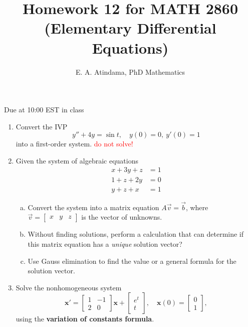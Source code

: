 \documentclass[a4paper,11pt,reqno]{amsart}
\title[MATH 2860 (Elementary Differential Equations)]{Homework 12 for MATH 2860 (Elementary Differential Equations)}
\author[Emmanuel Atindama]{E. A. Atindama, PhD Mathematics}
\numberwithin{equation}{section}
\begin{document}
\maketitle

Due at 10:00 EST in class

\begin{enumerate}[1.]
  \item Convert the IVP
        \[
        y'' + 4y = \sin t, \quad y(0)=0, \ y'(0)=1
        \]
        into a first-order system. \textcolor{red}{do not solve!}
  
  \item Given the system of algebraic equations 
      \[
      \begin{aligned}
        x + 3y +z  &= 1 \\
        1 + z + 2y &= 0 \\
        y+z+x &= 1
      \end{aligned}
      \]
      \begin{enumerate}[(a)]
      \item Convert the system into a matrix equation \(A \vec{v} = \vec{b}\), where \(\vec{v} =\begin{bmatrix} x & y & z \end{bmatrix}\) is the vector of unknowns.
      \item Without finding solutions, perform a calculation that can determine if this matrix equation has a \emph{unique} solution vector?
      \item Use Gauss elimination to find the value or a general formula for the solution vector.
      \end{enumerate}

  \item Solve the nonhomogeneous system
      \[
          \mathbf{x}' = \begin{bmatrix} 1 & -1 \\ 2 & 0 \end{bmatrix} \mathbf{x} + \begin{bmatrix} e^t \\ t \end{bmatrix}, \quad \mathbf{x}(0) = \begin{bmatrix} 0 \\ 1 \end{bmatrix},
      \]
      using the \textbf{variation of constants formula}.



\end{enumerate}
\end{document}
